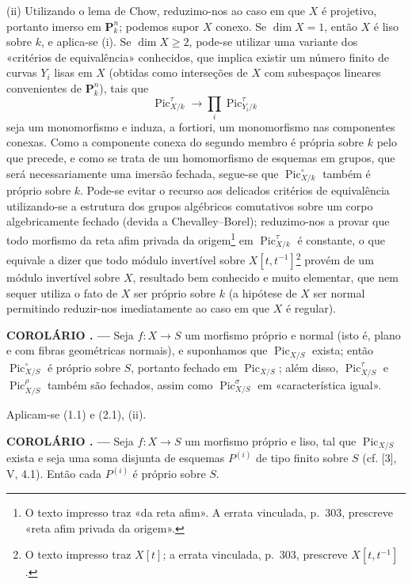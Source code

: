 \documentclass[11pt,twoside,openany]{book}
\numberwithin{equation}{section}
\theoremstyle{plain}
\theoremstyle{definition}
\theoremstyle{remark}
\newcommand{\result}[2]{%
  \par\medskip\noindent\textbf{#1%
  \if\relax\detokenize{#2}\relax\else\space#2\fi. ---}\enspace
}
\begin{document}
(ii) Utilizando o lema de Chow, reduzimo-nos ao caso em que $X$ é projetivo,
portanto imerso em $\mathbf P_k^n$; podemos supor $X$ conexo. Se $\dim X=1$,
então $X$ é liso sobre $k$, e aplica-se (i). Se
$\dim X\geq2$, pode-se utilizar uma variante dos «critérios de equivalência»
conhecidos, que implica existir um número finito de curvas $Y_i$ lisas em $X$
(obtidas como interseções de $X$ com subespaços lineares convenientes de
$\mathbf P_k^n$), tais que
\[
\operatorname{Pic}_{X/k}^\tau\longrightarrow
\prod_i\operatorname{Pic}_{Y_i/k}^\tau
\]
seja um monomorfismo e induza, a fortiori, um monomorfismo nas componentes
conexas. Como a componente conexa do segundo membro é própria sobre $k$ pelo
que precede, e como se trata de um homomorfismo de esquemas em grupos, que será
necessariamente uma imersão fechada, segue-se que
$\operatorname{Pic}_{X/k}^\circ$ também é próprio sobre $k$. Pode-se evitar o
recurso aos delicados critérios de equivalência utilizando-se a estrutura dos
grupos algébricos comutativos sobre um corpo algebricamente fechado (devida a
Chevalley--Borel); reduzimo-nos a provar que todo morfismo da reta afim privada
da origem\footnote{O texto impresso traz «da reta afim». A errata vinculada,
p.~303, prescreve «reta afim privada da origem».} em
$\operatorname{Pic}_{X/k}^\tau$ é constante, o que equivale a dizer que todo
módulo invertível sobre $X[t,t^{-1}]$\footnote{O texto impresso traz $X[t]$; a
errata vinculada, p.~303, prescreve $X[t,t^{-1}]$.} provém de um módulo
invertível sobre $X$, resultado bem conhecido e muito elementar, que nem sequer
utiliza o fato de $X$ ser próprio sobre $k$ (a hipótese de $X$ ser normal
permitindo reduzir-nos imediatamente ao caso em que $X$ é regular).

\result{COROLÁRIO}{2.3} Seja $f:X\longrightarrow S$ um morfismo próprio e
normal (isto é, plano e com fibras geométricas normais), e suponhamos que
$\operatorname{Pic}_{X/S}$ exista; então $\operatorname{Pic}_{X/S}^\circ$ é
próprio sobre $S$, portanto fechado em $\operatorname{Pic}_{X/S}$; além disso,
$\operatorname{Pic}_{X/S}^\tau$ e $\operatorname{Pic}_{X/S}^\rho$ também são
fechados, assim como $\operatorname{Pic}_{X/S}^\sigma$ em «característica
igual».

Aplicam-se (1.1) e (2.1), (ii).

\result{COROLÁRIO}{2.4} Seja $f:X\longrightarrow S$ um morfismo próprio e liso,
tal que $\operatorname{Pic}_{X/S}$ exista e seja uma soma disjunta de esquemas
$P^{(i)}$ de tipo finito sobre $S$ (cf. [3], V, 4.1). Então cada $P^{(i)}$ é
próprio sobre $S$.
\end{document}

